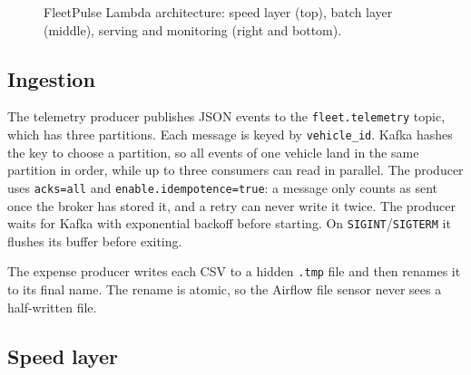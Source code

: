 \documentclass[11pt,a4paper]{article}
\newcommand{\code}[1]{\texttt{\small #1}}
\begin{document}
\begin{figure}[H]
{}
\caption{FleetPulse Lambda architecture: speed layer (top), batch layer (middle), serving and
monitoring (right and bottom).}
\label{fig:arch}
\end{figure}

\subsection{Ingestion}

The telemetry producer publishes JSON events to the \code{fleet.telemetry} topic, which has three
partitions. Each message is keyed by \code{vehicle\_id}. Kafka hashes the key to choose a
partition, so all events of one vehicle land in the same partition in order, while up to three
consumers can read in parallel. The producer uses \code{acks=all} and
\code{enable.idempotence=true}: a message only counts as sent once the broker has stored it, and a
retry can never write it twice. The producer waits for Kafka with exponential backoff before
starting. On \code{SIGINT}/\code{SIGTERM} it flushes its buffer before exiting.

The expense producer writes each CSV to a hidden \code{.tmp} file and then renames it to its final
name. The rename is atomic, so the Airflow file sensor never sees a half-written file.

\subsection{Speed layer}
\end{document}
